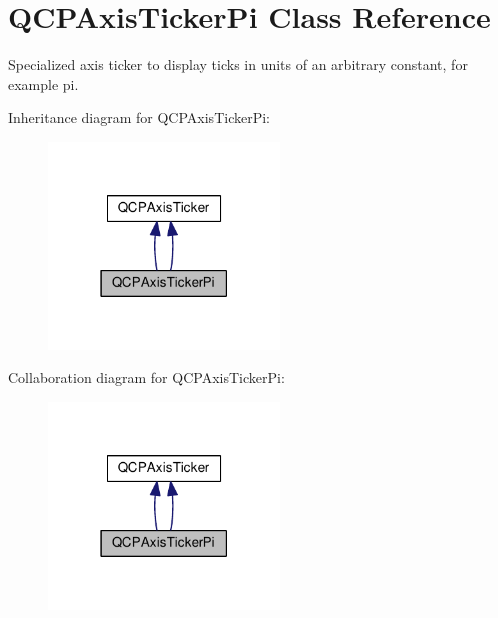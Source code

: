 \hypertarget{class_q_c_p_axis_ticker_pi}{}\section{Q\+C\+P\+Axis\+Ticker\+Pi Class Reference}
\label{class_q_c_p_axis_ticker_pi}


Specialized axis ticker to display ticks in units of an arbitrary constant, for example pi.  




Inheritance diagram for Q\+C\+P\+Axis\+Ticker\+Pi\+:\nopagebreak
\begin{figure}[H]
\begin{center}
\leavevmode
\includegraphics[width=174pt]{class_q_c_p_axis_ticker_pi__inherit__graph}
\end{center}
\end{figure}


Collaboration diagram for Q\+C\+P\+Axis\+Ticker\+Pi\+:\nopagebreak
\begin{figure}[H]
\begin{center}
\leavevmode
\includegraphics[width=174pt]{class_q_c_p_axis_ticker_pi__coll__graph}
\end{center}
\end{figure}
